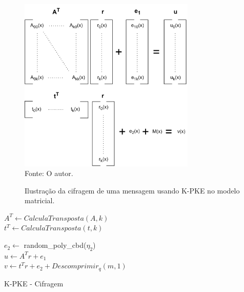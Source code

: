     \begin{figure}[htb!]
        \centering
        \caption{Ilustração da cifragem de uma mensagem usando K-PKE no modelo matricial.}
        \includegraphics[width=0.75\textwidth]{Figuras/kyber_enc.png}\\         
        \footnotesize{Fonte: O autor.}
        \label{fig:kyber_enc}
    \end{figure}

    \begin{algorithm}[!htbp]
        \SetAlgoLined
   
        $A^T   \leftarrow CalculaTransposta(A, k)$\\
        $t^{T} \leftarrow CalculaTransposta(t, k)$\\
        


        $e_2 \leftarrow$ random\_poly\_cbd($\eta_2$)\\

        $u \leftarrow A^{T} r + e_{1}$\\
        $v \leftarrow t^{T} r + e_{2} + Descomprimir_{q}(m,1)$\\
        
    
        \caption{K-PKE - Cifragem}
        \label{algo:kyber_encryption}
    \end{algorithm}

